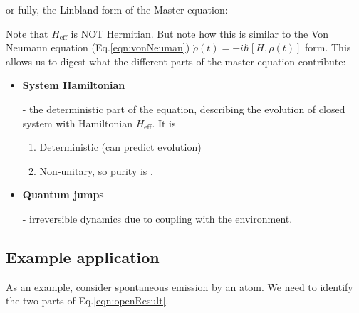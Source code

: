 \noindent or fully, the Linbland form of the Master equation:


\noindent Note that $H_\text{eff}$ is NOT Hermitian. But note how this is similar to the Von Neumann equation (Eq.\eqref{eqn:vonNeuman}) $\dot{\rho}(t) = -i\hbar\left[H,\rho(t)\right]$ form. This allows us to digest what the different parts of the master equation contribute:

\begin{itemize}
	\item \textbf{System Hamiltonian}
	
	 - the deterministic part of the equation, describing the evolution of closed system with Hamiltonian $H_\text{eff}$. It is
	\begin{enumerate}
		\item Deterministic (can predict evolution)
		\item Non-unitary, so purity is \textbf{}.
	\end{enumerate}
	
	\item \textbf{Quantum jumps}
	
	 - irreversible dynamics due to coupling with the environment.
\end{itemize}

\subsection{Example application}
As an example, consider spontaneous emission by an atom. We need to identify the two parts of Eq.\eqref{eqn:openResult}.

